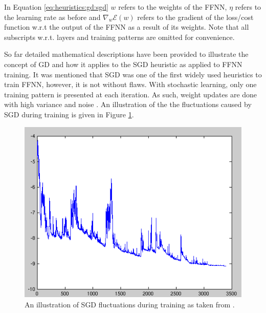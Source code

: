 In Equation \ref{eq:heuristics:gd:sgd} $w$ refers to the weights of the \ac{FFNN}, $\eta$ refers to the learning rate as before and $\nabla_{w}\mathcal{E}(w)$ refers to the gradient of the loss/cost function w.r.t the output of the \ac{FFNN} as a result of its weights. Note that all subscripts w.r.t. layers and training patterns are omitted for convenience.

So far detailed mathematical descriptions have been provided to illustrate the concept of \ac{GD} and how it applies to the \ac{SGD} heuristic as applied to \ac{FFNN} training. It was mentioned that \ac{SGD} was one of the first widely used heuristics to train \ac{FFNN}, however, it is not without flaws. With stochastic learning, only one training pattern is presented at each iteration. As such, weight updates are done with high variance and noise \cite{ref:ruder:2016}. An illustration of the the fluctuations caused by \ac{SGD} during training is given in Figure \ref{fig:heuristics:gd:sgd}.

\begin{figure}[htbp]
      \includegraphics[width=\textwidth]{images/sgd.png}
      \caption{An illustration of \ac{SGD} fluctuations during training as taken from \cite{ref:sgd:2006}.}
      \label{fig:heuristics:gd:sgd}
\end{figure}

